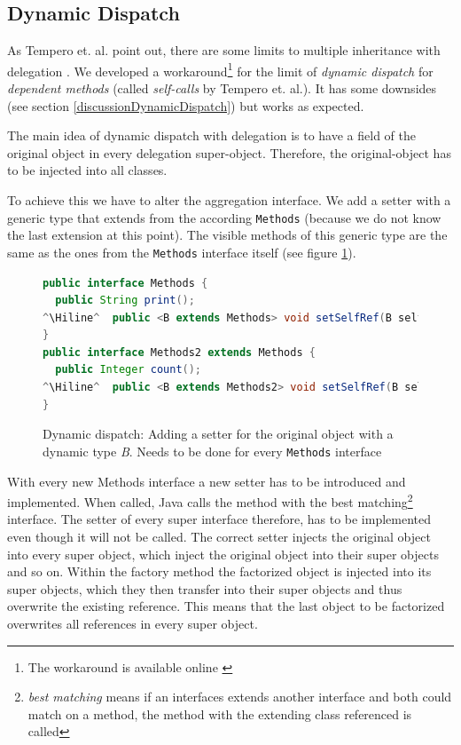\documentclass{report}
\newcommand{\Hiline}{\makebox[0pt][l]{\color[rgb]{1,0.96,0.98}\rule[-4pt]{\linewidth}{12.5pt}}}
\begin{document}
\subsection{Dynamic Dispatch}

As Tempero et. al. point out, there are some limits to multiple inheritance with delegation \cite{Tempero-Multiple-2000}. We developed a workaround\footnote{The workaround is available online \cite{Peuscher-GitHub-EP-2014}} for the limit of \emph{dynamic dispatch} for \emph{dependent methods} (called \emph{self-calls} by Tempero et. al.). It has some downsides (see section \ref{discussionDynamicDispatch}) but works as expected.

The main idea of dynamic dispatch with delegation is to have a field of the original object in every delegation super-object. Therefore, the original-object has to be injected into all classes.

To achieve this we have to alter the aggregation interface. We add a setter with a generic type that extends from the according \lstinline{Methods} (because we do not know the last extension at this point). The visible methods of this generic type are the same as the ones from the \lstinline{Methods} interface itself (see figure \ref{dynamicDispatchMethods}).

\begin{figure}[H]
\begin{lstlisting}[language=java]
public interface Methods {
  public String print();
^\Hiline^  public <B extends Methods> void setSelfRef(B selfRef);
}
public interface Methods2 extends Methods {
  public Integer count();
^\Hiline^  public <B extends Methods2> void setSelfRef(B selfRef);
}
\end{lstlisting}
\caption{Dynamic dispatch: Adding a setter for the original object with a dynamic type \emph{B}. Needs to be done for every \lstinline{Methods} interface}
\label{dynamicDispatchMethods}
\end{figure}

With every new Methods interface a new setter has to be introduced and implemented. When called, Java calls the method with the best matching\footnote{\emph{best matching} means if an interfaces extends another interface and both could match on a method, the method with the extending class referenced is called} interface. The setter of every super interface therefore, has to be implemented even though it will not be called. The correct setter injects the original object into every super object, which inject the original object into their super objects and so on. Within the factory method the factorized object is injected into its super objects, which they then transfer into their super objects and thus overwrite the existing reference. This means that the last object to be factorized overwrites all references in every super object.
\end{document}
